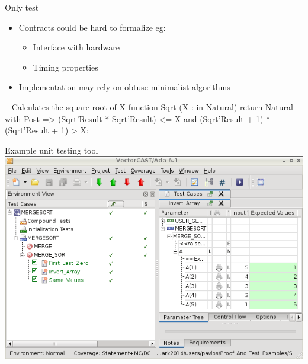 \documentclass{beamer}
\begin{document}
\begin{frame}[fragile]{Only test}
  \begin{itemize}
     \item Contracts could be hard to formalize eg:
     \begin{itemize}
        \item Interface with hardware
        \item Timing properties
     \end{itemize}
     \item Implementation may rely on obtuse minimalist algorithms
  \end{itemize}
  \begin{pxcode}[language=SPARK,style=magic,gobble=0]

  --  Calculates the square root of X
  function Sqrt (X : in Natural) return Natural 
  with Post =>
         (Sqrt'Result * Sqrt'Result) <= X and
          (Sqrt'Result + 1) * (Sqrt'Result + 1) > X;



  \end{pxcode}
\end{frame}
\begin{frame}[fragile]{Example unit testing tool}
  \includegraphics[width=\textwidth]{VectorCAST_resized.jpg}
\end{frame}
\end{document}
